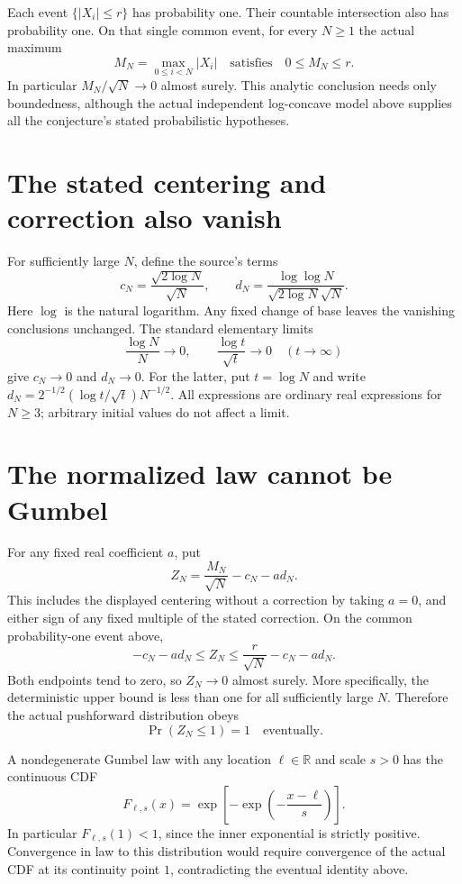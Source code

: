 \documentclass[11pt]{article}
\begin{document}
Each event $\{|X_i|\leq r\}$ has probability one.
Their countable intersection also has probability one.
On that single common event, for every $N\geq1$ the
actual maximum
\[
             M_N=\max_{0\leq i<N}|X_i|
                         \quad\text{satisfies}\quad
                         0\leq M_N\leq r.
\]
In particular $M_N/\sqrt N\to0$ almost surely. This
analytic conclusion needs only boundedness, although
the actual independent log-concave model above supplies
all the conjecture's stated probabilistic hypotheses.

\section*{The stated centering and correction also vanish}
For sufficiently large $N$, define the source's terms
\[
 c_N=\frac{\sqrt{2\log N}}{\sqrt N},\qquad
 d_N=\frac{\log\log N}{\sqrt{2\log N}\sqrt N}.
\]
Here $\log$ is the natural logarithm. Any fixed change
of base leaves the vanishing conclusions unchanged.
The standard elementary limits
\[
 \frac{\log N}{N}\longrightarrow0,\qquad
 \frac{\log t}{\sqrt t}\longrightarrow0
                                      \quad(t\to\infty)
\]
give $c_N\to0$ and $d_N\to0$. For the latter, put
$t=\log N$ and write
$d_N=2^{-1/2}(\log t/\sqrt t)N^{-1/2}$.
All expressions are ordinary real expressions for
$N\geq3$; arbitrary initial values do not affect a limit.

\newpage
\section*{The normalized law cannot be Gumbel}
For any fixed real coefficient $a$, put
\[
           Z_N=\frac{M_N}{\sqrt N}-c_N-a d_N.
\]
This includes the displayed centering without a
correction by taking $a=0$, and either sign of any
fixed multiple of the stated correction. On the common
probability-one event above,
\[
       -c_N-a d_N\leq Z_N
          \leq\frac r{\sqrt N}-c_N-a d_N.
\]
Both endpoints tend to zero, so $Z_N\to0$ almost surely.
More specifically, the deterministic upper bound is
less than one for all sufficiently large $N$. Therefore
the actual pushforward distribution obeys
\[
                        \Pr(Z_N\leq1)=1
                         \quad\text{eventually}.
\]

A nondegenerate Gumbel law with any location
$\ell\in\mathbb R$ and scale $s>0$ has the continuous CDF
\[
       F_{\ell,s}(x)=
          \exp\!\left[-\exp\!\left(-\frac{x-\ell}{s}\right)\right].
\]
In particular $F_{\ell,s}(1)<1$, since the inner
exponential is strictly positive. Convergence in law
to this distribution would require convergence of the
actual CDF at its continuity point $1$, contradicting
the eventual identity above.
\end{document}
